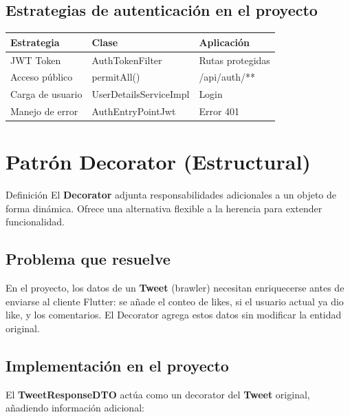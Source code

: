 \documentclass[12pt,a4paper]{article}
\begin{document}
\subsection{Estrategias de autenticaci\'on en el proyecto}

\begin{center}
\begin{tabular}{|l|l|l|}
\hline
\rowcolor{bsDark!15}\textbf{Estrategia} & \textbf{Clase} & \textbf{Aplicaci\'on} \\
\hline
JWT Token & AuthTokenFilter & Rutas protegidas \\
\hline
Acceso p\'ublico & permitAll() & /api/auth/** \\
\hline
Carga de usuario & UserDetailsServiceImpl & Login \\
\hline
Manejo de error & AuthEntryPointJwt & Error 401 \\
\hline
\end{tabular}
\end{center}

\newpage
\section{Patr\'on Decorator (Estructural)}

\begin{patronbox}{Definici\'on}
El \textbf{Decorator} adjunta responsabilidades adicionales a un objeto de forma din\'amica. Ofrece una alternativa flexible a la herencia para extender funcionalidad.
\end{patronbox}

\subsection{Problema que resuelve}

En el proyecto, los datos de un \textbf{Tweet} (brawler) necesitan enriquecerse antes de enviarse al cliente Flutter: se a\~nade el conteo de likes, si el usuario actual ya dio like, y los comentarios. El Decorator agrega estos datos sin modificar la entidad original.

\subsection{Implementaci\'on en el proyecto}

El \textbf{TweetResponseDTO} act\'ua como un decorator del \textbf{Tweet} original, a\~nadiendo informaci\'on adicional:
\end{document}
